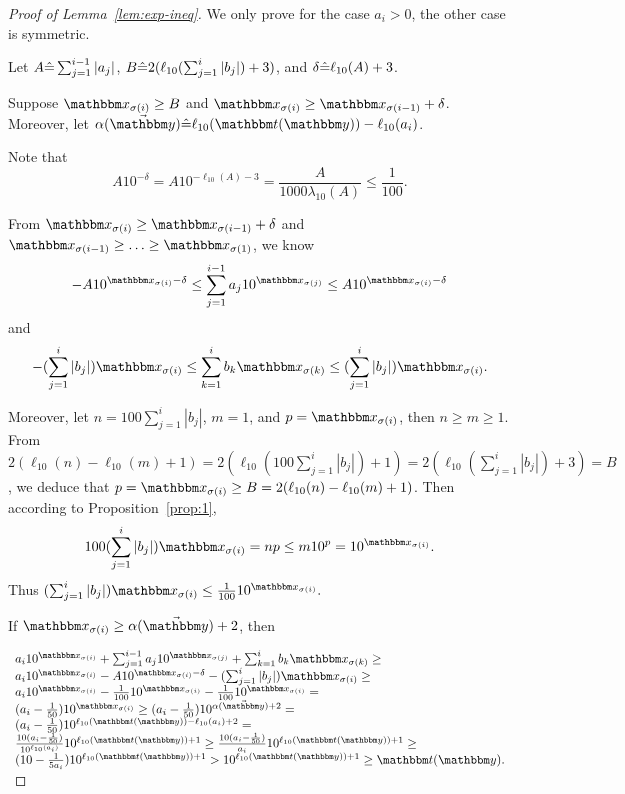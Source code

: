 \begin{proof}[Proof of Lemma~\ref{lem:exp-ineq}]
We only prove for the case $a_i > 0$, the other case is symmetric. 


Let $A\hat{=} \sum_{j=1}^{i-1}|a_j|$, $B \hat{=} 2(\ell_{10}(\sum_{j=1}^{i}|b_j|)+3)$, and $\delta\hat{=}  \ell_{10}(A)+3$. 

Suppose $\ivarx_{\sigma(i)} \ge B$ and $\ivarx_{\sigma(i)} \ge \ivarx_{\sigma(i-1)} + \delta$. Moreover, let $\alpha(\vec{\ivary}) \Def  \ell_{10}(\iterm(\ivary))- \ell_{10}(a_i)$.

Note that
 \begin{equation} 
   A10^{-\delta} =A 10^{-\ell_{10}(A)-3} = \frac{A}{1000\lambda_{10}(A)} \le \frac{1}{100}.   \label{eq:thm-ineq-1}
 \end{equation}
 
 From $\ivarx_{\sigma(i)} \ge \ivarx_{\sigma(i-1)} + \delta$ and $\ivarx_{\sigma(i-1)} \ge \ldots \ge \ivarx_{\sigma(1)}$, 
we know   
$$-A 10^{\ivarx_{\sigma(i)} - \delta} \le  \sum_{j=1}^{i-1} a_j 10^{\ivarx_{\sigma(j)}} \le A 10^{\ivarx_{\sigma(i)} - \delta}$$
and
$$-(\sum_{j=1}^{i}|b_j|) \ivarx_{\sigma(i)} \le \sum_{k=1}^{i} b_k \ivarx_{\sigma(k)} \le (\sum_{j=1}^{i}|b_j|) \ivarx_{\sigma(i)}.$$ 

Moreover, let $n = 100\sum_{j=1}^{i}|b_j|$, $m = 1$, and $p = \ivarx_{\sigma(i)}$, then 
$n \ge m \ge 1$. From $2(\ell_{10}(n)- \ell_{10}(m)+1) = 2 (\ell_{10}(100 \sum_{j=1}^{i}|b_j|) + 1) = 2 (\ell_{10}(\sum_{j=1}^{i}|b_j|) + 3) = B$, we deduce that $p = \ivarx_{\sigma(i)} \ge B = 2(\ell_{10}(n)- \ell_{10}(m)+1)$.
Then according to Proposition~\ref{prop:1}, 
$$100(\sum_{j=1}^{i}|b_j|)\ivarx_{\sigma(i)} = np \le m 10^p = 10^{\ivarx_{\sigma(i)}}.$$
Thus 
$(\sum_{j=1}^{i}|b_j|)\ivarx_{\sigma(i)}  \le \frac{1}{100} 10^{\ivarx_{\sigma(i)}}.$

If $\ivarx_{\sigma(i)} \ge   \alpha(\vec{\ivary}) + 2$, then 

$
\begin{array}{l}
a_i 10^{\ivarx_{\sigma(i)}}+\sum_{j=1}^{i-1} a_j 10^{\ivarx_{\sigma(j)}} + \sum_{k=1}^{i}b_k \ivarx_{\sigma(k)} \ge \\
a_i 10^{\ivarx_{\sigma(i)}} - A 10^{\ivarx_{\sigma(i)} - \delta} - (\sum_{j=1}^{i}|b_j|) \ivarx_{\sigma(i)}  \ge \\
a_i 10^{\ivarx_{\sigma(i)}} - \frac{1}{100}10^{\ivarx_{\sigma(i)}} - \frac{1}{100} 10^{\ivarx_{\sigma(i)}} = \\
(a_i - \frac{1}{50}) 10^{\ivarx_{\sigma(i)}} \ge (a_i - \frac{1}{50}) 10^{ \alpha(\vec{\ivary}) + 2} = \\
(a_i - \frac{1}{50}) 10^{  \ell_{10}(\iterm(\ivary))- \ell_{10}(a_i) + 2} = \\
\frac{10(a_i - \frac{1}{50})}{10^{\ell_{10}(a_i)} } 10^{ \ell_{10}(\iterm(\ivary))+1} \ge \frac{10(a_i - \frac{1}{50})} {a_i} 10^{ \ell_{10}(\iterm(\ivary))+1} \ge \\
(10 - \frac{1}{5a_i}) 10^{ \ell_{10}(\iterm(\ivary))+1} > 10^{ \ell_{10}(\iterm(\ivary))+1} \ge \iterm(\ivary).
\end{array}
$


\end{proof}
